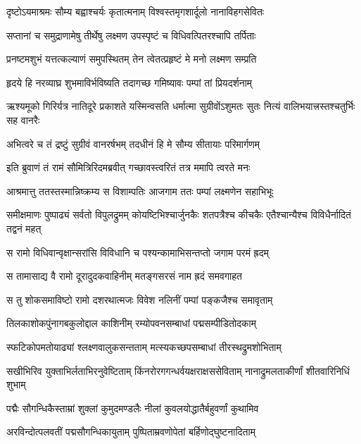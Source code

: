 \twolineshloka
{दृष्टोऽयमाश्रमः सौम्य बह्वाश्चर्यः कृतात्मनाम्}
{विश्वस्तमृगशार्दूलो नानाविहगसेवितः} %

\twolineshloka
{सप्तानां च समुद्राणामेषु तीर्थेषु लक्ष्मण}
{उपस्पृष्टं च विधिवत्पितरश्चापि तर्पिताः} %

\twolineshloka
{प्रनष्टमशुभं यत्तत्कल्याणं समुपस्थितम्}
{तेन त्वेतत्प्रहृष्टं मे मनो लक्ष्मण सम्प्रति} %

\twolineshloka
{हृदये हि नरव्याघ्र शुभमाविर्भविष्यति}
{तदागच्छ गमिष्यावः पम्पां तां प्रियदर्शनाम्} %

\threelineshloka
{ऋश्यमूको गिरिर्यत्र नातिदूरे प्रकाशते}
{यस्मिन्वसति धर्मात्मा सुग्रीवोंऽशुमतः सुतः}
{नित्यं वालिभयात्त्रस्तश्चतुर्भिः सह वानरैः} %

\twolineshloka
{अभित्वरे च तं द्रष्टुं सुग्रीवं वानरर्षभम्}
{तदधीनं हि मे सौम्य सीतायाः परिमार्गणम्} %

\twolineshloka
{इति ब्रुवाणं तं रामं सौमित्रिरिदमब्रवीत्}
{गच्छावस्त्वरितं तत्र ममापि त्वरते मनः} %

\twolineshloka
{आश्रमात्तु ततस्तस्मान्निष्क्रम्य स विशाम्पतिः}
{आजगाम ततः पम्पां लक्ष्मणेन सहाभिभूः} %

\threelineshloka
{समीक्षमाणः पुष्पाढ्यं सर्वतो विपुलद्रुमम्}
{कोयष्टिभिश्चार्जुनकैः शतपत्रैश्च कीचकैः}
{एतैश्चान्यैश्च विविधैर्नादितं तद्वनं महत्} %

\twolineshloka
{स रामो विधिवान्वृक्षान्सरांसि विविधानि च}
{पश्यन्कामाभिसन्तप्तो जगाम परमं ह्रदम्} %

\twolineshloka
{स तामासाद्य वै रामो दूरादुदकवाहिनीम्}
{मतङ्गसरसं नाम ह्रदं समवगाहत} %

\twolineshloka
{स तु शोकसमाविष्टो रामो दशरथात्मजः}
{विवेश नलिनीं पम्पां पङ्कजैश्च समावृताम्} %

\twolineshloka
{तिलकाशोकपुंनागबकुलोद्दाल काशिनीम्}
{रम्योपवनसम्बाधां पद्मसम्पीडितोदकाम्} %

\twolineshloka
{स्फटिकोपमतोयाढ्यां श्लक्ष्णवालुकसन्तताम्}
{मत्स्यकच्छपसम्बाधां तीरस्थद्रुमशोभिताम्} %

\threelineshloka
{सखीभिरिव युक्ताभिर्लताभिरनुवेष्टिताम्}
{किंनरोरगगन्धर्वयक्षराक्षससेविताम्}
{नानाद्रुमलताकीर्णां शीतवारिनिधिं शुभाम्} %

\twolineshloka
{पद्मैः सौगन्धिकैस्ताम्रां शुक्लां कुमुदमण्डलैः}
{नीलां कुवलयोद्धातैर्बहुवर्णां कुथामिव} %

\twolineshloka
{अरविन्दोत्पलवतीं पद्मसौगन्धिकायुताम्}
{पुष्पिताम्रवणोपेतां बर्हिणोद्घुष्टनादिताम्} %

